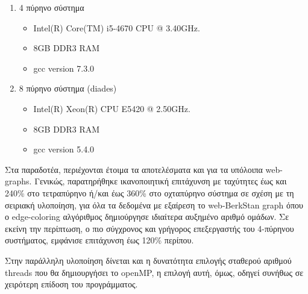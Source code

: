 \begin{enumerate}

\item 4 πύρηνο σύστημα
\begin{itemize}
\item Intel(R) Core(TM) i5-4670 CPU @ 3.40GHz.
\item 8GB DDR3 RAM
\item gcc version 7.3.0
\end{itemize}

\item 8 πύρηνο σύστημα (diades)
\begin{itemize}
\item Intel(R) Xeon(R) CPU E5420  @ 2.50GHz.
\item 8GB DDR3 RAM
\item gcc version 5.4.0
\end{itemize}
\end{enumerate}

Στα παραδοτέα, περιέχονται έτοιμα τα αποτελέσματα και για τα υπόλοιπα web-graphs. Γενικώς, παρατηρήθηκε ικανοποιητική επιτάχυνση με ταχύτητες έως και 240\% στο τετραπύρηνο ή/και έως 360\% στο οχταπύρηνο σύστημα σε σχέση με τη σειριακή υλοποίηση, για όλα τα δεδομένα με εξαίρεση το web-BerkStan graph όπου ο edge-coloring αλγόριθμος δημιούργησε ιδιαίτερα αυξημένο αριθμό ομάδων. Σε εκείνη την περίπτωση, ο πιο σύγχρονος και γρήγορος επεξεργαστής του 4-πύρηνου συστήματος, εμφάνισε επιτάχυνση έως 120\% περίπου.

Στην παράλληλη υλοποίηση δίνεται και η δυνατότητα επιλογής σταθερού αριθμού threads που θα δημιουργήσει το openMP, η επιλογή αυτή, όμως, οδηγεί συνήθως σε χειρότερη επίδοση του προγράμματος.


